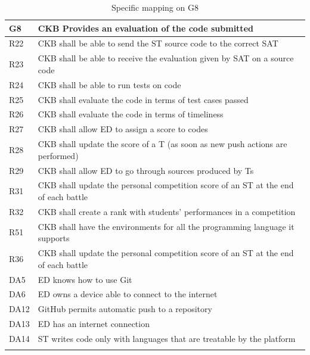   \begin{longtable}{|l|p{12cm}|}
    \hline
    \textbf{G8} & \textbf{CKB Provides an evaluation of the code submitted}      \\
    \hline
    R22 & CKB shall be able to send the ST source code to the correct SAT \\
    \hline
    R23 & CKB shall be able to receive the evaluation given by SAT on a source code \\
    \hline
    R24 & CKB shall be able to run tests on code \\
    \hline
    R25 & CKB shall evaluate the code in terms of test cases passed \\
    \hline
    R26 & CKB shall evaluate the code in terms of timeliness \\
    \hline
    R27 & CKB shall allow ED to assign a score to codes \\
    \hline
    R28 & CKB shall update the score of a T (as soon as new push actions are performed) \\
    \hline
    R29 & CKB shall allow ED to go through sources produced by Ts \\
    \hline
    R31 & CKB shall update the personal competition score of an ST at the end of each battle \\
    \hline
    R32 & CKB shall create a rank with students' performances in a competition \\
    \hline
    R51 & CKB shall have the environments for all the programming language it supports \\
    \hline
    R36 & CKB shall update the personal competition score of an ST at the end of each battle \\
    \hline
    DA5 & ED knows how to use Git \\
    \hline
    DA6 & ED owns a device able to connect to the internet \\
    \hline
    DA12 & GitHub permits automatic push to a repository \\
    \hline
    DA13 & ED has an internet connection \\
    \hline
    DA14 & ST writes code only with languages that are treatable by the platform \\
    \hline

    \caption{Specific mapping on G8}
    \label{tab:mappingG8}
  \end{longtable}

